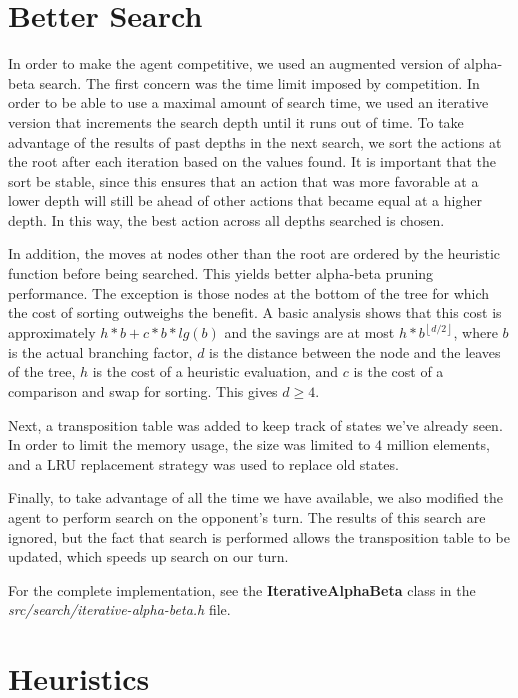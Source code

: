 \documentclass[journal,hidelinks]{IEEEtran}
\begin{document}
\section{Better Search}

In order to make the agent competitive, we used an augmented version of alpha-beta search. The first concern was the time limit imposed by competition. In order to be able to use a maximal amount of search time, we used an iterative version that increments the search depth until it runs out of time. To take advantage of the results of past depths in the next search, we sort the actions at the root after each iteration based on the values found. It is important that the sort be stable, since this ensures that an action that was more favorable at a lower depth will still be ahead of other actions that became equal at a higher depth. In this way, the best action across all depths searched is chosen.

In addition, the moves at nodes other than the root are ordered by the heuristic function before being searched. This yields better alpha-beta pruning performance. The exception is those nodes at the bottom of the tree for which the cost of sorting outweighs the benefit. A basic analysis shows that this cost is
approximately $h*b + c*b*lg(b)$ and the savings are at most $h*b^{\left \lfloor{d/2}\right \rfloor}$, where $b$ is the actual branching factor, $d$ is the distance between the node and the leaves of the tree, $h$ is the cost of a heuristic evaluation, and $c$ is the cost of a comparison and swap for sorting. This gives $d \ge 4$.

Next, a transposition table was added to keep track of states we've already seen. In order to limit the memory usage, the size was limited to $4$ million elements, and a LRU replacement strategy was used to replace old states.

Finally, to take advantage of all the time we have available, we also modified the agent to perform search on the opponent's turn. The results of this search are ignored, but the fact that search is performed allows the transposition table to be updated, which speeds up search on our turn.

For the complete implementation, see the \textbf{IterativeAlphaBeta} class in the \textit{src/search/iterative-alpha-beta.h} file.

\section{Heuristics}
\label{sec:heuristic}
\end{document}
